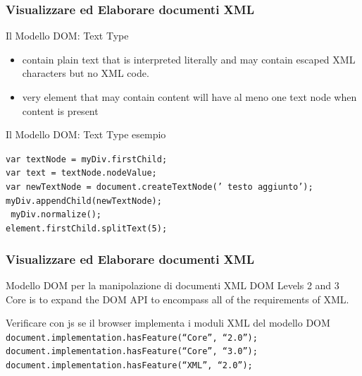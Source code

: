 \begin{frame}
    \frametitle{Visualizzare ed Elaborare documenti XML}
    \addtocounter{nframe}{1}
    

     \begin{block}{Il Modello DOM: Text Type}
        \begin{itemize}
            \item contain plain text that is interpreted literally and may contain escaped XML characters but no XML code.
            \item very element that may contain content will have al meno one text node when content is present
        \end{itemize}
     \end{block}

     \begin{block}{Il Modello DOM: Text Type esempio}

        \texttt{var textNode = myDiv.firstChild;}
        \\\texttt{var text = textNode.nodeValue;}
        \\\texttt{var newTextNode = document.createTextNode(' testo aggiunto');}
        \\\texttt{myDiv.appendChild(newTextNode);}
        \\\texttt{ myDiv.normalize();}
        \\\texttt{element.firstChild.splitText(5);}
       
     \end{block}

\end{frame}


\begin{frame}
    \frametitle{Visualizzare ed Elaborare documenti XML}
    \addtocounter{nframe}{1}
    

     \begin{block}{Modello DOM per la manipolazione di documenti XML}
        DOM Levels 2 and 3 Core is to expand the DOM API to encompass all of the requirements of XML.
     \end{block}

     \begin{block}{Verificare con js se il browser implementa i moduli XML del modello DOM}
        \texttt{document.implementation.hasFeature(“Core”, “2.0”); }
        \\\texttt{document.implementation.hasFeature(“Core”, “3.0”);} 
        \\\texttt{document.implementation.hasFeature(“XML”, “2.0”);}
     \end{block}
     
\end{frame}

